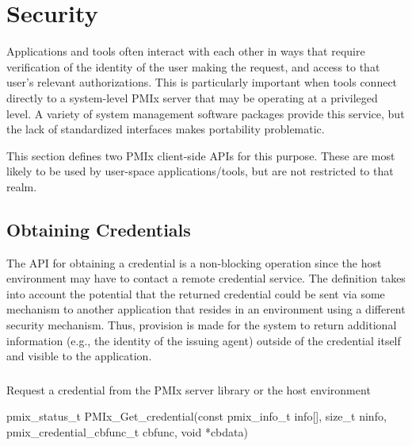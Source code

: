 \chapter{Security}
\label{chap:api_security}

Applications and tools often interact with each other in ways that require verification of the identity of the user making the request, and access to that user's relevant authorizations. This is particularly important when tools connect directly to a system-level \ac{PMIx} server that may be operating at a privileged level. A variety of system management software packages provide this service, but the lack of standardized interfaces makes portability problematic.

This section defines two \ac{PMIx} client-side \acp{API} for this purpose. These are most likely to be used by user-space applications/tools, but are not restricted to that realm.


\section{Obtaining Credentials}
\label{chap:api_security:obtain}

The \ac{API} for obtaining a credential is a non-blocking operation since the host environment may have to contact a remote credential service. The definition takes into account the potential that the returned credential could be sent via some mechanism to another application that resides in an environment using a different security mechanism. Thus, provision is made for the system to return additional information (e.g., the identity of the issuing agent) outside of the credential itself and visible to the application.

\subsection{}

\summary

Request a credential from the \ac{PMIx} server library or the host environment

\format

\cspecificstart
\begin{codepar}
pmix_status_t
PMIx_Get_credential(const pmix_info_t info[], size_t ninfo,
                    pmix_credential_cbfunc_t cbfunc, void *cbdata)
\end{codepar}
\cspecificend

